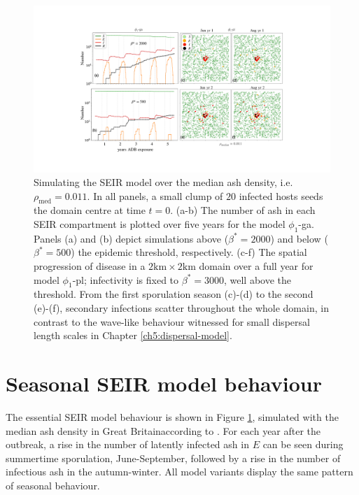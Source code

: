 \begin{landscape}
\begin{figure}
    \centering
    \includegraphics[scale=0.45]{chapter6/figures/fig4-seir.pdf} %
     \caption{Simulating the SEIR model over the median ash density, i.e. $\rho_{\mathrm{med}} = 0.011$. 
     In all panels, a small clump of $20$ infected hosts seeds the domain centre at time $t=0$.
     (a-b) The number of ash in each SEIR compartment is plotted over five years for the model $\phi_1$-ga.
     Panels (a) and (b) depict simulations above ($\beta^*=2000$) and below ($\beta^*=500$) the epidemic threshold, respectively. 
     (c-f) The spatial progression of disease in a $2\mathrm{km} \times 2\mathrm{km}$ domain over a full year for model $\phi_1$-pl; 
     infectivity is fixed to  $\beta^*=3000$, well above the threshold.
     From the first sporulation season (c)-(d) to the second (e)-(f), secondary infections scatter throughout the whole domain, in contrast to the wave-like behaviour witnessed for small dispersal length scales in Chapter \ref{ch5:dispersal-model}.}
    \label{fig:SEIR-spread}
\end{figure}
\end{landscape}


\section{Seasonal SEIR model behaviour}
\label{sec:seir-behaviour}

The essential SEIR model behaviour is shown in Figure \ref{fig:SEIR-spread}, simulated with the median ash density in Great Britain\textemdash according to \cite{hill.data}.
For each year after the outbreak, a rise in the number of latently infected ash in $E$ can be seen during summertime sporulation, June-September, followed by a rise in the number of infectious ash in the autumn-winter. 
All model variants display the same pattern of seasonal behaviour. 

